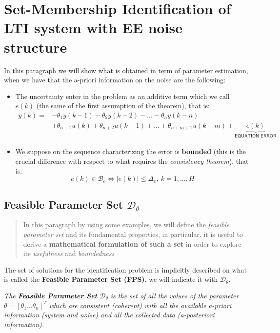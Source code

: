 \section{Set-Membership Identification of LTI system with EE noise structure}
In this paragraph we will show what is obtained in term of parameter estimation, when we have that the a-priori information on the noise are the following:
\begin{itemize}
    \itemsep-0.3em
    \item[\ding{51}] The uncertainty enter in the problem as an additive term which we call $e(k)$ (the same of the first assumption of the theorem), that is:
    \begin{align*}
        y(k) = &-\theta_1{y(k-1)}-\theta_2{y(k-2)}-...-\theta_n{y(k-n)}\\
        &+\theta_{n+1}u(k)+\theta_{n+2}u(k-1)+...+\theta_{n+m+1}u(k-m) + \underbrace{e(k)}_{\textsf{EQUATION ERROR}}
    \end{align*}
    \item[\ding{51}] We suppose on the sequence characterizing the error is \textbf{bounded} (this is the crucial difference with respect to what requires the \textit{consistency theorem}), that is:
    \begin{equation}\label{eq:boundedness}
        e(k)\in\mathcal{B}_e \iff \vert e(k) \vert \le \Delta_e, \ k=1, ..., H
    \end{equation}
\end{itemize}
\subsection{Feasible Parameter Set $\mathcal{D}_\theta$}

\begin{quotation}
    \noindent
    \textsf{In this paragraph by using some examples, we will define the \textit{feasible parameter set} and its fundamental properties, in particular, it is useful to derive a \textbf{mathematical formulation of such a set} in order to explore its \textit{usefulness} and \textit{boundedness}}
\end{quotation}

\noindent
The set of solutions for the identification problem is implicitly described on what is called the \textbf{Feasible Parameter Set (FPS)}, we will indicate it with $\mathcal{D}_\theta$.

\begin{definition} \textit{The \textbf{Feasible Parameter Set} $\mathcal{D}_\theta$ is the set of all the values of the parameter $\theta=[\theta_1 ... \theta_n]^T$ which are consistent (coherent) with all the available a-priori information (system and noise) and all the collected data (a-posteriori information).}
\end{definition}


